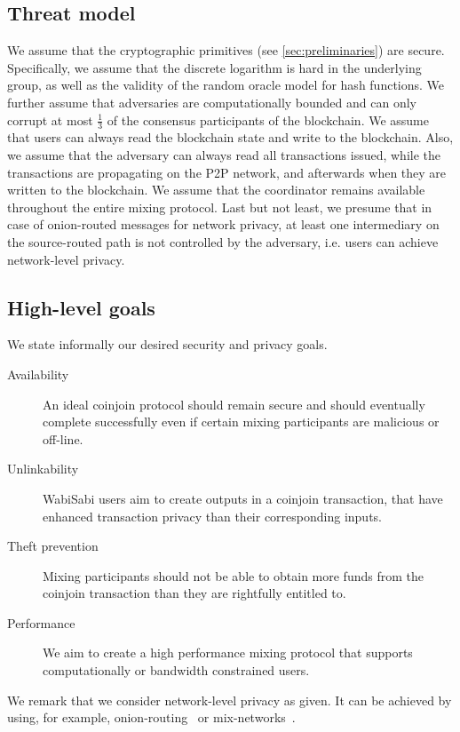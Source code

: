 \documentclass[a4paper]{article}
\begin{document}
\subsection{Threat model} \label{sec:threatmodel}

We assume that the cryptographic primitives (see \cref{sec:preliminaries})
are secure. Specifically, we assume that the discrete logarithm is hard in the underlying group, as well as the validity of the random oracle model for hash functions.  We further assume that adversaries are computationally bounded and can only corrupt at most $\frac{1}{3}$ of the consensus participants of the blockchain. We assume that users can always read the blockchain state and write to the blockchain. Also, we assume that the adversary can always read all transactions issued, while the transactions are propagating on the P2P network,
and afterwards when they are written to the blockchain. We assume that the coordinator remains available throughout the entire mixing protocol. Last but not least, we presume that in case of onion-routed messages for network privacy, at least one intermediary on the source-routed path is not controlled by the adversary, i.e. users can achieve network-level privacy.

\subsection{High-level goals} \label{sec:goals}
We state informally our desired security and privacy goals.
\begin{description}
\item[Availability] An ideal coinjoin protocol should remain secure and should eventually complete successfully even if certain mixing participants are malicious or off-line.
 \item[Unlinkability] WabiSabi users aim to create outputs in a coinjoin transaction, that have enhanced transaction privacy than their corresponding inputs.
 \item[Theft prevention] Mixing participants should not be able to obtain more funds from the coinjoin transaction than they are rightfully entitled to.
 \item[Performance] We aim to create a high performance mixing protocol that supports computationally or bandwidth constrained users.
\end{description}

We remark that we consider network-level privacy as given. It can be achieved by using, for example, onion-routing~\cite{reed1998anonymous} or mix-networks~\cite{piotrowska2017loopix}.
\end{document}
